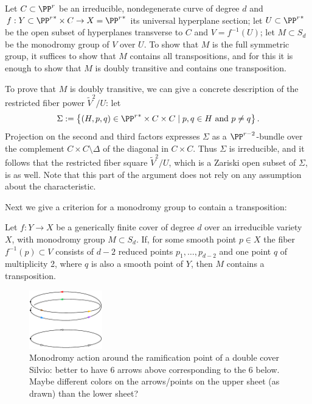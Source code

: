Let $C \subset \PP^r$ be an irreducible, nondegenerate curve of degree $d$ and $f : Y \subset {\PP^r}^* \times C \to  X = {\PP^r}^*$ its universal hyperplane section; let $U \subset {\PP^r}^*$ be the open subset of hyperplanes transverse to $C$ and $V = f^{-1}(U)$; let $M \subset S_d$ be the monodromy group of $V$ over $U$.
To show that  $M$ is the full symmetric group, it suffices to show that $M$ contains all transpositions, and for this it is enough to show that $M$ is doubly transitive and contains one transposition.

To prove that $M$ is doubly transitive, we can give a concrete description of the restricted fiber power $\tilde V^2/U$: let
$$
\Sigma := \left\{ (H, p, q) \in {\PP^r}^* \times C \times C \mid p, q \in H \text{ and } p \neq q \right\}.
$$
Projection on the second and third factors expresses $\Sigma$ as a $\PP^{r-2}$-bundle over the complement $C \times C \setminus \Delta$ of the diagonal in $C \times C$. Thus $\Sigma$ is irreducible, and it follows that the restricted fiber square $\tilde V^2/U$, which is a Zariski open subset of $\Sigma$, is as well. Note that this part of the argument does not rely on any assumption about the characteristic.

Next we give a criterion for a monodromy group to contain a transposition:

\begin{lemma}\label{transposition lemma}
Let $f : Y \to X$ be a generically finite cover of degree $d$ over an irreducible variety $X$, with  monodromy group $M \subset S_d$.  
If,  for some smooth point $p \in X$ the fiber $f^{-1}(p)\subset V$ consists of $d-2$ reduced points $p_1,\dots, p_{d-2}$ and one point $q$ of multiplicity 2, where $q$ is also a smooth point of $Y$, then $M$ contains a transposition.
\end{lemma}

\begin{figure}
\centerline {\includegraphics[height=1in]{"main/Fig10-1"}}
\caption{Monodromy action around the ramification point of a double cover
{Silvio: better to have 6 arrows above corresponding to the 6 below. Maybe different colors on the  
arrows/points on the upper sheet (as drawn) than the lower sheet?}}
\label{$d=2$ monodromy}
\end{figure}

